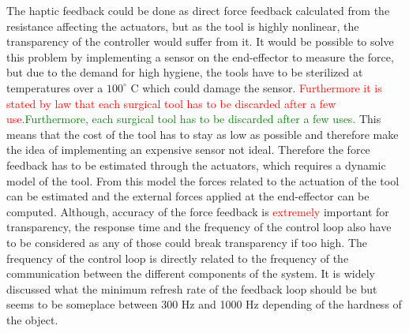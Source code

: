 The haptic feedback could be done as direct force feedback calculated from the resistance affecting the actuators, but as the tool is highly nonlinear, the transparency of the controller would suffer from it. It would be possible to solve this problem by implementing a sensor on the end-effector to measure the force, but due to the demand for high hygiene, the tools have to be sterilized at temperatures over a $100^\circ$ C which could damage the sensor.\textcolor{red}{ Furthermore it is stated by law that each surgical tool has to be discarded after a few use.}\textcolor{green}{Furthermore, each surgical tool has to be discarded after a few uses\cite{catalog_davinci}.} This means that the cost of the tool has to stay as low as possible and therefore make the idea of implementing an expensive sensor not ideal. Therefore the force feedback has to be estimated through the actuators, which requires a dynamic model of the tool. From this model the forces related to the actuation of the tool can be estimated and the external forces applied at the end-effector can be computed. Although, accuracy of the force feedback is \textcolor{red}{extremely} important for transparency, the response time and the frequency of the control loop also have to be considered as any of those could break transparency if too high. The frequency of the control loop is directly related to the frequency of the communication between the different components of the system. It is widely discussed what the minimum refresh rate of the feedback loop should be but seems to be someplace between 300 Hz and 1000 Hz depending of the hardness of the object\cite{coles2011role}.%


